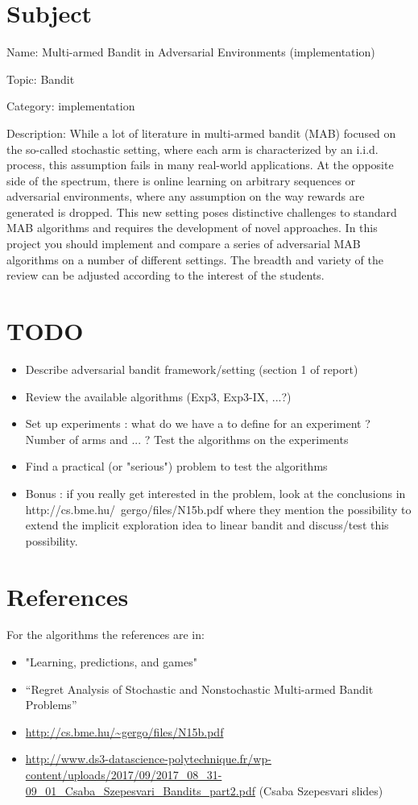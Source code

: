 \documentclass[10pt,a4paper]{article}
\author{Nicolas Schreuder, Sholom Schechtman}
\begin{document}
\section{Subject}

Name: Multi-armed Bandit in Adversarial Environments (implementation)

Topic:  Bandit

Category: implementation

Description:  While a lot of literature in multi-armed bandit (MAB) focused on the so-called stochastic setting, where each arm is characterized by an i.i.d. process, this assumption fails in many real-world applications. At the opposite side of the spectrum, there is online learning on arbitrary sequences or adversarial environments, where any assumption on the way rewards are generated is dropped. This new setting poses distinctive challenges to standard MAB algorithms and requires the development of novel approaches. In this project you should implement and compare a series of adversarial MAB algorithms on a number of different settings. The breadth and variety of the review can be adjusted according to the interest of the students.

\section{TODO}

\begin{itemize}
\item Describe adversarial bandit framework/setting (section 1 of report)
\item Review the available algorithms (Exp3, Exp3-IX, ...?)
\item Set up experiments : what do we have a to define for an experiment ? Number of arms and ... ? Test the algorithms on the experiments
\item  Find a practical (or "serious") problem to test the algorithms
\item Bonus : if you really get interested in the problem, look at the conclusions in http://cs.bme.hu/~gergo/files/N15b.pdf where they mention the possibility to extend the implicit exploration idea to linear bandit and discuss/test this possibility.
\end{itemize}


\section{References}

For the algorithms the references are in:

\begin{itemize}
\item "Learning, predictions, and games"
\item “Regret Analysis of Stochastic and Nonstochastic Multi-armed Bandit Problems”
\item \url{http://cs.bme.hu/~gergo/files/N15b.pdf}
\item\url{http://www.ds3-datascience-polytechnique.fr/wp-content/uploads/2017/09/2017_08_31-09_01_Csaba_Szepesvari_Bandits_part2.pdf} (Csaba Szepesvari slides)
\end{itemize}
\end{document}
